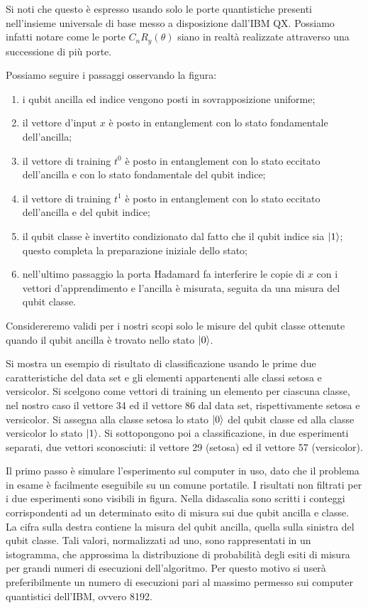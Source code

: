 Si noti che questo è espresso usando solo le porte quantistiche presenti 
nell'insieme universale di base messo a disposizione dall'IBM QX. Possiamo infatti notare 
come le porte $C_n R_y (\theta)$ siano in realtà realizzate attraverso una 
successione di più porte. 

Possiamo seguire i passaggi osservando la figura: 
\begin{enumerate}
    \item i qubit ancilla ed indice vengono posti in sovrapposizione uniforme; 
    \item il vettore d'input $x$ è posto in entanglement con lo stato fondamentale 
    dell'ancilla;
    \item il vettore di training $t^0$ è posto in entanglement con lo stato eccitato 
    dell'ancilla e con lo stato fondamentale del qubit indice;
    \item il vettore di training $t^1$ è posto in entanglement con lo stato eccitato 
    dell'ancilla e del qubit indice;
    \item il qubit classe è invertito condizionato dal fatto che il qubit indice sia $\ket{1}$; 
    questo completa la preparazione iniziale dello stato; 
    \item nell'ultimo passaggio la porta Hadamard fa interferire le copie di $x$ con i vettori 
    d'apprendimento e l'ancilla è misurata, seguita da una misura del qubit classe. 
\end{enumerate}
Considereremo validi per i nostri scopi solo le misure del qubit classe ottenute quando il 
qubit ancilla è trovato nello stato $\ket{0}$. 

Si mostra un esempio di risultato di classificazione usando le prime due caratteristiche 
del data set e gli elementi appartenenti alle classi setosa e versicolor. 
Si scelgono come vettori di training un elemento per ciascuna classe, nel nostro caso 
il vettore 34 ed il vettore 86 dal data set, rispettivamente setosa e versicolor. 
Si assegna alla classe setosa lo stato $\ket{0}$ del qubit classe ed alla classe 
versicolor lo stato $\ket{1}$. 
Si sottopongono poi a classificazione, in due esperimenti separati, due vettori sconosciuti: 
il vettore 29 (setosa) ed il vettore 57 (versicolor). 

Il primo passo è simulare l'esperimento sul computer in uso, dato che il problema in esame
è facilmente eseguibile su un comune portatile. I risultati non filtrati per i due esperimenti 
sono visibili in figura. Nella didascalia sono scritti i conteggi corrispondenti ad un 
determinato esito di misura sui due qubit ancilla e classe. La cifra sulla destra contiene la 
misura del qubit ancilla, quella sulla sinistra del qubit classe. Tali valori, normalizzati ad uno, 
sono rappresentati in un istogramma, che approssima la distribuzione di probabilità degli esiti di 
misura per grandi numeri di esecuzioni dell'algoritmo. Per questo motivo si userà preferibilmente 
un numero di esecuzioni pari al massimo permesso sui computer quantistici dell'IBM, ovvero 8192. 


